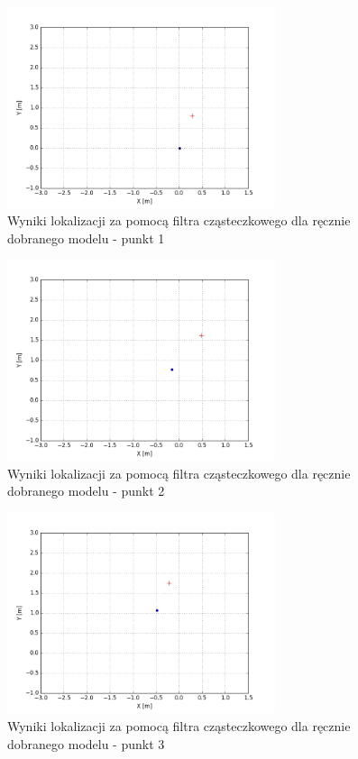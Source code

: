 \begin{figure}[H]
\centering
\includegraphics[width=0.7\textwidth]{img/pf-map3-1.png}
\caption{Wyniki lokalizacji za pomocą filtra cząsteczkowego dla ręcznie dobranego modelu - punkt 1}
\label{fig:pf-first}
\end{figure}
\begin{figure}[H]
\centering
\includegraphics[width=0.7\textwidth]{img/pf-map3-2.png}
\caption{Wyniki lokalizacji za pomocą filtra cząsteczkowego dla ręcznie dobranego modelu - punkt 2}
\end{figure}
\begin{figure}[H]
\centering
\includegraphics[width=0.7\textwidth]{img/pf-map3-3.png}
\caption{Wyniki lokalizacji za pomocą filtra cząsteczkowego dla ręcznie dobranego modelu - punkt 3}
\end{figure}
